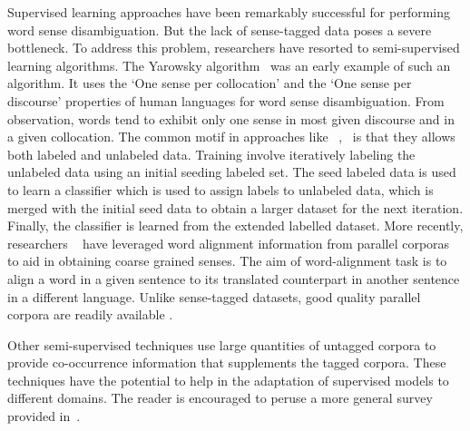 \documentclass[11pt,letterpaper]{article}
\begin{document}
Supervised learning approaches have been remarkably successful for performing word sense disambiguation. But the lack of sense-tagged data poses a severe bottleneck. To address this problem, researchers have resorted to semi-supervised learning algorithms. The Yarowsky algorithm~\cite{yarowsky1995unsupervised} was an early example of such an algorithm. It uses the `One sense per collocation' and the `One sense per discourse' properties of human languages for word sense disambiguation. From observation, words tend to exhibit only one sense in most given discourse and in a given collocation. The common motif in approaches like ~\cite{yarowsky1995unsupervised},~\cite{le2008semi} is that they allows both labeled and unlabeled data. Training involve iteratively labeling the unlabeled data using an initial seeding labeled set. The seed labeled data is used to learn a classifier which is used to assign labels to unlabeled data, which is merged with the initial seed data to obtain a larger dataset for the next iteration. Finally, the classifier is learned from the extended labelled dataset.
More recently, researchers ~\cite{Ng} have leveraged word alignment information from parallel corporas to aid in obtaining coarse grained senses. The aim of word-alignment task is to align a word in a given sentence to its translated counterpart in another sentence in a different language. Unlike sense-tagged datasets, good quality parallel corpora are readily available . 


Other semi-supervised techniques use large quantities of untagged corpora to provide co-occurrence information that supplements the tagged corpora. These techniques have the potential to help in the adaptation of supervised models to different domains. The reader is encouraged to peruse a more general  survey provided in~\cite{navigli2009word}. 
\end{document}
